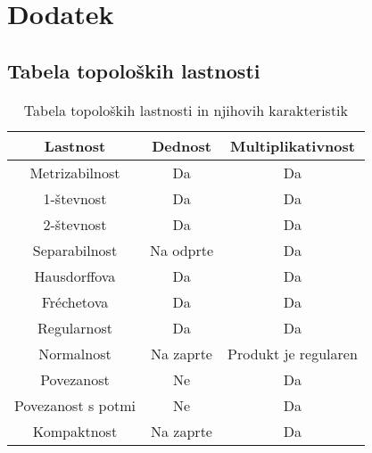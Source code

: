 \section{Dodatek}

\renewcommand{\thesubsection}{\Alph{subsection}}

\subsection{Tabela topoloških lastnosti}

\begin{table}[!h]
\centering
\caption{Tabela topoloških lastnosti in njihovih karakteristik}
\begin{tabular}{c|c|c}
Lastnost & Dednost & Multiplikativnost 
\\
\hline
Metrizabilnost & Da & Da
\\
1-števnost & Da & Da
\\
2-števnost & Da & Da
\\
Separabilnost & Na odprte & Da
\\
Hausdorffova & Da & Da
\\
Fréchetova & Da & Da
\\
Regularnost & Da & Da
\\
Normalnost & Na zaprte & Produkt je regularen
\\
Povezanost & Ne & Da
\\
Povezanost s potmi & Ne & Da
\\
Kompaktnost & Na zaprte & Da
\end{tabular} 
\end{table}
